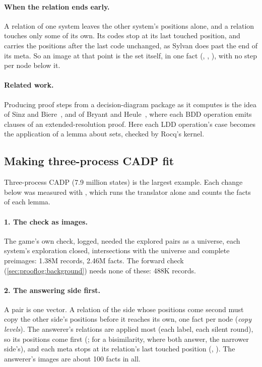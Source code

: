 \paragraph{When the relation ends early.} A relation of one system
leaves the other system's positions alone, and a relation touches only
some of its own. Its codes stop at its last touched position, and
 carries the positions after the last code unchanged, as
Sylvan does past the end of its meta. So an image at that point is the set
itself, in one fact (, ,
), with no step per node below it.

\paragraph{Related work.} Producing proof steps from a decision-diagram
package as it computes is the idea of Sinz and Biere~\cite{sinz-biere06},
and of Bryant and Heule~\cite{bryant-heule21}, where each BDD operation
emits clauses of an extended-resolution proof. Here each LDD operation's
case becomes the application of a lemma about sets, checked by Rocq's
kernel.

\subsection{Making three-process CADP fit}\label{sec:prooflog:fit}

Three-process CADP (7.9 million states) is the largest example. Each
change below was measured with , which runs
the translator alone and counts the facts of each lemma.

\paragraph{1. The check as images.} The game's own check, logged, needed
the explored pairs as a universe, each system's exploration closed,
intersections with the universe and complete preimages: 1.38M records,
2.46M facts. The forward check (\cref{sec:prooflog:background}) needs
none of these: 488K records.

\paragraph{2. The answering side first.} A pair is one vector. A relation
of the side whose positions come second must copy the other side's
positions before it reaches its own, one fact per node (\emph{copy
levels}). The answerer's relations are applied most (each label, each
silent round), so its positions come first (;
for a bisimilarity, where both answer, the narrower side's), and each
meta stops at its relation's last touched position (,
). The answerer's images are about 100 facts
in all.

